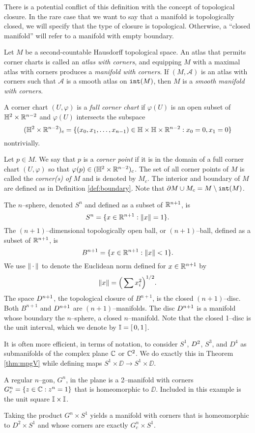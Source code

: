 There is a potential conflict of this definition with the concept of topological closure.
In the rare case that we want to say that a manifold is topologically closed, we will specify that the type of closure is topological.
Otherwise, a ``closed manifold'' will refer to a manifold with empty boundary.

\begin{defn}
	Let $M$ be a second-countable Hausdorff topological space.
	An atlas that permits corner charts is called an \emph{atlas with corners}, and equipping $M$ with a maximal atlas with corners produces a \emph{manifold with corners}.
	If $(M,\mathcal{A})$ is an atlas with corners such that $\mathcal{A}$ is a smooth atlas on $\mathtt{int}(M)$, then $M$ is a \emph{smooth manifold with corners}.
	
	A corner chart $(U,\varphi)$ is a \emph{full corner chart} if $\varphi(U)$ is an open subset of $\mathbb{H}^2\times\mathbb{R}^{n-2}$ and $\varphi(U)$ intersects the subspace 
	\[
		(\mathbb{H}^2\times\mathbb{R}^{n-2})_c = \{(x_0,x_1,\dots,x_{n-1})\in\mathbb{H}\times\mathbb{H}\times\mathbb{R}^{n-2}:x_0=0,x_1=0\}
	\]
	nontrivially.
	
	Let $p\in M$.
	We say that $p$ is a \emph{corner point} if it is in the domain of a full corner chart $(U,\varphi)$ so that $\varphi(p)\in(\mathbb{H}^2\times\mathbb{R}^{n-2})_c$.
	The set of all corner points of $M$ is called the \emph{corner(s) of $M$} and is denoted by $M_c$.
	The interior and boundary of $M$ are defined as in Definition \ref{def:boundary}.
	Note that $\partial M\cup M_c=M\setminus\mathtt{int}(M)$.
\end{defn}

\begin{ex}
	The $n$--sphere, denoted $S^n$ and defined as a subset of $\mathbb{R}^{n+1}$, is
	\[
	S^n = \{x\in\mathbb{R}^{n+1}:\left\lVert x \right\rVert=1\}.
	\]
	The $(n+1)$--dimensional topologically open ball, or $(n+1)$--ball, defined as a subset of $\mathbb{R}^{n+1}$, is
	\[
	B^{n+1} = \{x\in\mathbb{R}^{n+1}:\left\lVert x \right\rVert< 1\}.
	\]
	We use $\left\lVert \,\cdot\, \right\rVert$ to denote the Euclidean norm defined for $x\in\mathbb{R}^{n+1}$ by
	\[
	\left\lVert x \right\rVert = \Big( \sum x_i^2 \Big)^{1/2}.
	\]
	The space $D^{n+1}$, the topological closure of $B^{n+1}$, is the closed $(n+1)$--disc.
	Both $B^{n+1}$ and $D^{n+1}$ are $(n+1)$--manifolds.
	The disc $D^{n+1}$ is a manifold whose boundary the $n$--sphere, a closed $n$--manifold.
	Note that the closed 1--disc is the unit interval, which we denote by $\mathbb{I}=[\,0,1\,]$.
	
	It is often more efficient, in terms of notation, to consider $S^1$, $D^2$, $S^3$, and $D^4$ as submanifolds of the complex plane $\mathbb{C}$ or $\mathbb{C}^2$.
	We do exactly this in Theorem \ref{thm:mpgV} while defining maps $S^1\times\DD\to S^1\times\DD$.
\end{ex}

\begin{ex}
	A regular $n$--gon, $G^n$, in the plane is a 2--manifold with corners $G_c^n=\{z\in\mathbb{C}:z^n=1\}$ that is homeomorphic to $\DD$.
	Included in this example is the unit square $\mathbb{I}\times \mathbb{I}$.
	
	Taking the product $G^n\times S^1$ yields a manifold with corners that is homeomorphic to $D^2\times S^1$ and whose corners are exactly $G^n_c\times S^1$.	
\end{ex}


